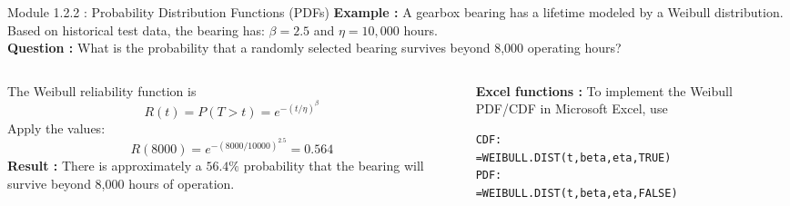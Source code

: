 \documentclass{beamer}
\begin{document}
\begin{frame}[fragile]{Module 1.2.2 : Probability Distribution Functions (PDFs)}
\scriptsize
\textbf{Example :} A gearbox bearing has a lifetime modeled by a Weibull distribution.
Based on historical test data, the bearing has: $\beta = 2.5$ and $\eta = 10,000$ hours. \\ \vspace{0.25cm}
\textbf{Question :} What is the probability that a randomly selected bearing survives beyond 8,000 operating hours? \\ \vspace{0.5cm}
\begin{columns}
\begin{column}{0.52\textwidth}
The Weibull reliability function is
\begin{equation}
R(t)=P(T>t)=e^{-(t/\eta)^\beta}
\end{equation}
Apply the values:
\begin{equation}
R(8000) = e^{-(8000/10000)^{2.5}} = 0.564
\end{equation}
\textbf{Result :} There is approximately a $56.4\%$ probability that the bearing
will survive beyond 8,000 hours of operation.
\end{column}
\begin{column}{0.48\textwidth}
\textbf{Excel functions :} To implement the Weibull PDF/CDF in Microsoft Excel, use
\begin{verbatim}
CDF:
=WEIBULL.DIST(t,beta,eta,TRUE)
PDF:
=WEIBULL.DIST(t,beta,eta,FALSE)
\end{verbatim}
\end{column}
\end{columns}
\end{frame}
\end{document}
